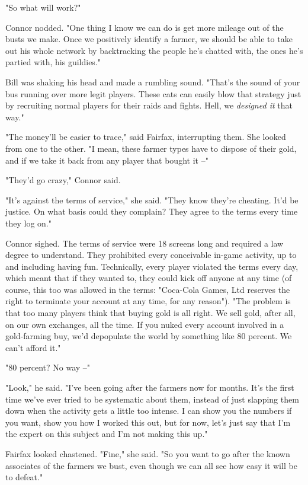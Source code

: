 "So what will work?"

Connor nodded. "One thing I know we can do is get more mileage out
of the busts we make. Once we positively identify a farmer, we
should be able to take out his whole network by backtracking the
people he's chatted with, the ones he's partied with, his
guildies."

Bill was shaking his head and made a rumbling sound. "That's the
sound of your bus running over more legit players. These cats can
easily blow that strategy just by recruiting normal players for
their raids and fights. Hell, we \emph{designed it} that way."

"The money'll be easier to trace," said Fairfax, interrupting them.
She looked from one to the other. "I mean, these farmer types have
to dispose of their gold, and if we take it back from any player
that bought it --"

"They'd go crazy," Connor said.

"It's against the terms of service," she said. "They know they're
cheating. It'd be justice. On what basis could they complain? They
agree to the terms every time they log on."

Connor sighed. The terms of service were 18 screens long and
required a law degree to understand. They prohibited every
conceivable in-game activity, up to and including having fun.
Technically, every player violated the terms every day, which meant
that if they wanted to, they could kick off anyone at any time (of
course, this too was allowed in the terms: "Coca-Cola Games, Ltd
reserves the right to terminate your account at any time, for any
reason"). "The problem is that too many players think that buying
gold is all right. We sell gold, after all, on our own exchanges,
all the time. If you nuked every account involved in a gold-farming
buy, we'd depopulate the world by something like 80 percent. We
can't afford it."

"80 percent? No way --"

"Look," he said. "I've been going after the farmers now for months.
It's the first time we've ever tried to be systematic about them,
instead of just slapping them down when the activity gets a little
too intense. I can show you the numbers if you want, show you how I
worked this out, but for now, let's just say that I'm the expert on
this subject and I'm not making this up."

Fairfax looked chastened. "Fine," she said. "So you want to go
after the known associates of the farmers we bust, even though we
can all see how easy it will be to defeat."

